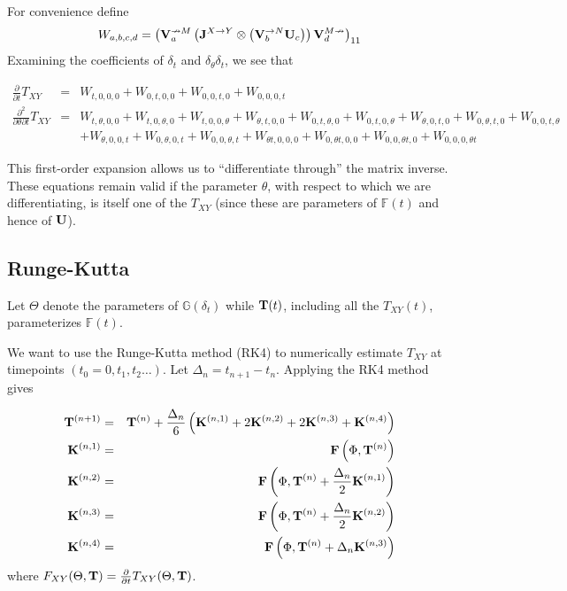 \documentclass{article}
\begin{document}
For convenience define
\[
W_{a,b,c,d} =
\left( {\bf V}^{\nrightarrow M}_a \left( {\bf J}^{X \to Y} \otimes \left( {\bf V}^{\rightarrow N}_b {\bf U}_c \right) \right) {\bf V}^{M \nrightarrow}_d \right)_{11}
\]
Examining the coefficients of $\delta_t$ and $\delta_\theta \delta_t$, we see that

\begin{eqnarray*}
  \frac{\partial}{\partial t}T_{XY} & = &
  W_{t,0,0,0} + W_{0,t,0,0} + W_{0,0,t,0} + W_{0,0,0,t}
  \\
  \frac{\partial^2}{\partial \theta \partial t}T_{XY} & = &
  W_{t,\theta,0,0} + W_{t,0,\theta,0} + W_{t,0,0,\theta}
  + W_{\theta,t,0,0} + W_{0,t,\theta,0} + W_{0,t,0,\theta}
  + W_{\theta,0,t,0} + W_{0,\theta,t,0} + W_{0,0,t,\theta}
  \\ & &
  + W_{\theta,0,0,t} + W_{0,\theta,0,t} + W_{0,0,\theta,t}
  + W_{\theta t,0,0,0} + W_{0,\theta t,0,0} + W_{0,0,\theta t,0} + W_{0,0,0,\theta t}
\end{eqnarray*}

This first-order expansion allows us to ``differentiate through'' the matrix inverse.
These equations remain valid if the parameter $\theta$, with respect to which we are differentiating, is itself one of the $T_{XY}$
(since these are parameters of $\mathbb{F}(t)$ and hence of ${\bf U}$).

\subsection{Runge-Kutta}

Let $\Theta$ denote the parameters of $\mathbb{G}(\delta_t)$
while ${\bf T}(t)$, including all the $T_{XY}(t)$, parameterizes $\mathbb{F}(t)$.

We want to use the Runge-Kutta method (RK4) to numerically estimate $T_{XY}$ at timepoints $(t_0=0, t_1, t_2 \ldots)$.
Let $\Delta_n = t_{n+1}-t_n$.
Applying the RK4 method gives

\begin{eqnarray*}
  {\bf T}^{(n+1)} & = & {\bf T}^{(n)} + \frac{\Delta_n}{6} \left( {\bf K}^{(n,1)} + 2{\bf K}^{(n,2)} + 2{\bf K}^{(n,3)} + {\bf K}^{(n,4)} \right) \\
  {\bf K}^{(n,1)} & = & {\bf F}\left(\Phi,{\bf T}^{(n)}\right) \\
  {\bf K}^{(n,2)} & = & {\bf F}\left(\Phi,{\bf T}^{(n)} + \frac{\Delta_n}{2} {\bf K}^{(n,1)}\right) \\
  {\bf K}^{(n,3)} & = & {\bf F}\left(\Phi,{\bf T}^{(n)} + \frac{\Delta_n}{2} {\bf K}^{(n,2)}\right) \\
  {\bf K}^{(n,4)} & = & {\bf F}\left(\Phi,{\bf T}^{(n)} + \Delta_n {\bf K}^{(n,3)}\right)
\end{eqnarray*}
where $F_{XY}(\Theta,{\bf T}) = \frac{\partial}{\partial t} T_{XY}(\Theta,{\bf T})$.
\end{document}
